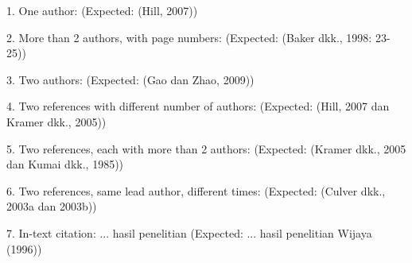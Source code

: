 \documentclass[12pt,a4paper]{article}
\begin{document}
1. One author: \citep{hill2007} (Expected: (Hill, 2007))

2. More than 2 authors, with page numbers: \citep[23-25]{baker1998} (Expected: (Baker dkk., 1998: 23-25))

3. Two authors: \citep{gao2009} (Expected: (Gao dan Zhao, 2009))

4. Two references with different number of authors: \citep{hill2007, kramer2005} (Expected: (Hill, 2007 dan Kramer dkk., 2005))

5. Two references, each with more than 2 authors: \citep{kramer2005, kumai1985} (Expected: (Kramer dkk., 2005 dan Kumai dkk., 1985))

6. Two references, same lead author, different times: \citep{culver2003a, culver2003b} (Expected: (Culver dkk., 2003a dan 2003b))

7. In-text citation: ... hasil penelitian \citet{wijaya1996} (Expected: ... hasil penelitian Wijaya (1996))

\printbibliography
\end{document}
